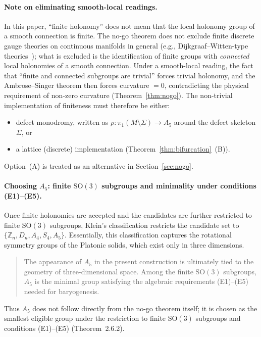 \documentclass[sn-mathphys-num,Numbered]{sn-jnl}
\theoremstyle{thmstyleone}
\theoremstyle{thmstylethree}
\theoremstyle{thmstyletwo}
\newcommand{\SO}{\mathrm{SO}}
\begin{document}
\paragraph{Note on eliminating smooth-local readings.}
In this paper, ``finite holonomy'' does not mean that the local
holonomy group of a smooth connection is finite.  The no-go theorem
does not exclude finite discrete gauge theories on continuous manifolds
in general (e.g., Dijkgraaf--Witten-type theories~\cite{DW1990}); what
is excluded is the identification of finite groups with \emph{connected}
local holonomies of a smooth connection.  Under a smooth-local reading,
the fact that ``finite and connected subgroups are trivial'' forces
trivial holonomy, and the Ambrose--Singer theorem then forces curvature
$= 0$, contradicting the physical requirement of non-zero curvature
(Theorem~\ref{thm:nogo}).  The non-trivial implementation of finiteness must
therefore be either:
\begin{itemize}
  \item[(A)] defect monodromy, written as
    $\rho:\pi_1(M\setminus\Sigma)\to A_5$ around the defect skeleton
    $\Sigma$, or
  \item[(B)] a lattice (discrete) implementation (Theorem~\ref{thm:bifurcation}~(B)).
\end{itemize}
Option~(A) is treated as an alternative in Section~\ref{sec:nogo}.

\paragraph{Choosing $A_5$: finite $\SO(3)$ subgroups and minimality under
conditions (E1)--(E5).}
Once finite holonomies are accepted and the candidates are further
restricted to finite $\SO(3)$ subgroups, Klein's classification
restricts the candidate set to
$\{\mathbb{Z}_n, D_n, A_4, S_4, A_5\}$.
Essentially, this classification captures the rotational symmetry groups
of the Platonic solids, which exist only in three dimensions.

\begin{quote}
  The appearance of $A_5$ in the present construction is ultimately tied
  to the geometry of three-dimensional space. Among the finite $\SO(3)$
  subgroups, $A_5$ is the minimal group satisfying the algebraic
  requirements (E1)--(E5) needed for baryogenesis.
\end{quote}

Thus $A_5$ does not follow directly from the no-go theorem itself; it
is chosen as the smallest eligible group under the restriction to finite
$\SO(3)$ subgroups and conditions (E1)--(E5) (Theorem~2.6.2).
\end{document}
